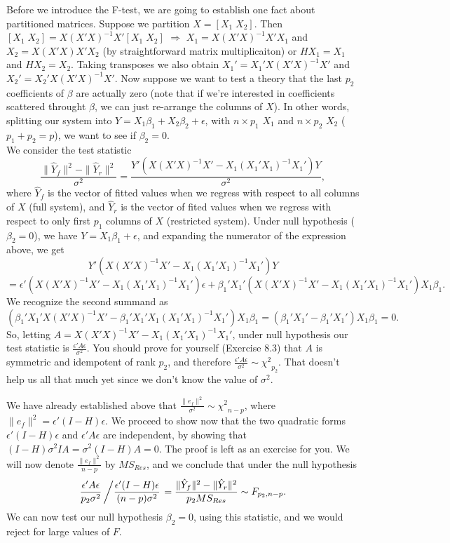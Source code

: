 \documentclass[12pt,oneside]{article}
\begin{document}
Before we introduce the F-test, we are going to establish one fact
about partitioned matrices. Suppose we partition $X = [X_1\; X_2]$. Then
$[X_1\; X_2] = X(X'X)^{-1}X'[X_1\; X_2]$ $\Longrightarrow$ $X_1 =
X(X'X)^{-1}X'X_1$ and $X_2 = X(X'X)X'X_2$ (by straightforward matrix
multiplicaiton) or $HX_1 = X_1$ and $HX_2 = X_2$. Taking transposes we
also obtain $X_1 ' = X_1 ' X(X'X)^{-1}X'$ and $X_2 ' = X_2'
X(X'X)^{-1}X'$. Now suppose we want to test a theory that the last
$p_2$ coefficients of $\beta$ are actually zero (note that if we're
interested in coefficients scattered throught $\beta$, we can just
re-arrange the columns of $X$). In other words, splitting our system
into $Y = X_1 \beta_1 + X_2 \beta_2 + \epsilon$, with $n \times p_1$
$X_1$ and $n \times p_2$ $X_2$ ($p_1 + p_2 = p$), we want to see if
$\beta_2 = 0$. \\

We consider the test statistic $$\frac{\|\hat{Y}_f\|^2 -
  \|\hat{Y}_r\|^2}{\sigma^2} = \frac{Y'(X(X'X)^{-1}X' - X_1 (X_1 '
  X_1)^{-1}X_1 ')Y}{\sigma^2},$$ where $\hat{Y}_f$ is the
vector of fitted values when we regress with respect to all
columns of $X$ (full system), and $\hat{Y}_r$ is the vector of fited
  values when we regress with respect to only first $p_1$
columns of $X$ (restricted system). Under null hypothesis ($\beta_2 =
0$), we have $Y = X_1 \beta_1 + \epsilon$, and expanding the
numerator of the expression above, we get $$Y'(X(X'X)^{-1}X' - X_1 (X_1
' X_1)^{-1} X_1')Y$$ $$=\epsilon'(X(X'X)^{-1}X' - X_1 (X_1 ' X_1)^{-1}
X_1 ') \epsilon + \beta_1' X_1' (X(X'X)^{-1}X' - X_1 (X_1' X_1)^{-1}
X_1') X_1 \beta_1.$$ We recognize the second summand as $$(\beta_1' X_1'
X(X'X)^{-1}X' - \beta_1' X_1' X_1 (X_1' X_1)^{-1} X_1')X_1 \beta_1 =
(\beta_1' X_1 ' - \beta_1' X_1')X_1 \beta_1 = 0.$$ So, letting $A =
X(X'X)^{-1}X' - X_1 (X_1' X_1)^{-1} X_1'$, under null
hypothesis our test statistic is $\frac{\epsilon' A
  \epsilon}{\sigma^2}$. You should prove for yourself (Exercise 8.3) that $A$ is
symmetric and idempotent of rank $p_2$, and therefore $\frac{\epsilon' A
  \epsilon}{\sigma^2} \sim {\chi^2}_{p_2}$. That doesn't help us all that much yet since we don't know
the value of $\sigma^2$.

We have already established above that $\frac{\|e_f\|^2}{\sigma^2} \sim
{\chi^2}_{n-p}$, where $\|e_f\|^2 = \epsilon'(I-H) \epsilon$. We
proceed to show now that the two quadratic forms $\epsilon ' (I-H)
\epsilon$ and $\epsilon' A \epsilon$ are independent, by showing that
$(I-H) \sigma^2 I A = \sigma^2 (I-H)A = 0$. The proof is left as an
exercise for you. We will now denote $\frac{\|e_f\|^2}{n-p}$ by
$MS_{Res}$, and we conclude that under the null hypothesis $$\frac{\epsilon' A
  \epsilon}{p_2 \sigma^2} \left/\frac{\epsilon'(I-H) \epsilon}{(n-p)
  \sigma^2}\right.  = \frac{\|\hat{Y}_f\|^2 - \|\hat{Y}_r\|^2}{p_2 MS_{Res}}
  \sim F_{p_2, n-p}.$$ We can now test our null hypothesis $\beta_2 =
  0$, using this statistic, and we would reject for large values of $F$.
\end{document}
